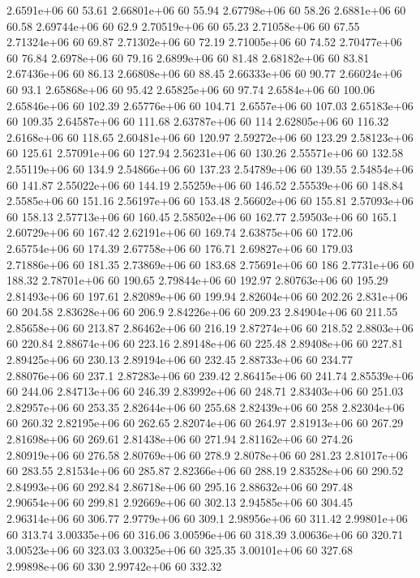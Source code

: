 2.6591e+06 60 53.61
2.66801e+06 60 55.94
2.67798e+06 60 58.26
2.6881e+06 60 60.58
2.69744e+06 60 62.9
2.70519e+06 60 65.23
2.71058e+06 60 67.55
2.71324e+06 60 69.87
2.71302e+06 60 72.19
2.71005e+06 60 74.52
2.70477e+06 60 76.84
2.6978e+06 60 79.16
2.6899e+06 60 81.48
2.68182e+06 60 83.81
2.67436e+06 60 86.13
2.66808e+06 60 88.45
2.66333e+06 60 90.77
2.66024e+06 60 93.1
2.65868e+06 60 95.42
2.65825e+06 60 97.74
2.6584e+06 60 100.06
2.65846e+06 60 102.39
2.65776e+06 60 104.71
2.6557e+06 60 107.03
2.65183e+06 60 109.35
2.64587e+06 60 111.68
2.63787e+06 60 114
2.62805e+06 60 116.32
2.6168e+06 60 118.65
2.60481e+06 60 120.97
2.59272e+06 60 123.29
2.58123e+06 60 125.61
2.57091e+06 60 127.94
2.56231e+06 60 130.26
2.55571e+06 60 132.58
2.55119e+06 60 134.9
2.54866e+06 60 137.23
2.54789e+06 60 139.55
2.54854e+06 60 141.87
2.55022e+06 60 144.19
2.55259e+06 60 146.52
2.55539e+06 60 148.84
2.5585e+06 60 151.16
2.56197e+06 60 153.48
2.56602e+06 60 155.81
2.57093e+06 60 158.13
2.57713e+06 60 160.45
2.58502e+06 60 162.77
2.59503e+06 60 165.1
2.60729e+06 60 167.42
2.62191e+06 60 169.74
2.63875e+06 60 172.06
2.65754e+06 60 174.39
2.67758e+06 60 176.71
2.69827e+06 60 179.03
2.71886e+06 60 181.35
2.73869e+06 60 183.68
2.75691e+06 60 186
2.7731e+06 60 188.32
2.78701e+06 60 190.65
2.79844e+06 60 192.97
2.80763e+06 60 195.29
2.81493e+06 60 197.61
2.82089e+06 60 199.94
2.82604e+06 60 202.26
2.831e+06 60 204.58
2.83628e+06 60 206.9
2.84226e+06 60 209.23
2.84904e+06 60 211.55
2.85658e+06 60 213.87
2.86462e+06 60 216.19
2.87274e+06 60 218.52
2.8803e+06 60 220.84
2.88674e+06 60 223.16
2.89148e+06 60 225.48
2.89408e+06 60 227.81
2.89425e+06 60 230.13
2.89194e+06 60 232.45
2.88733e+06 60 234.77
2.88076e+06 60 237.1
2.87283e+06 60 239.42
2.86415e+06 60 241.74
2.85539e+06 60 244.06
2.84713e+06 60 246.39
2.83992e+06 60 248.71
2.83403e+06 60 251.03
2.82957e+06 60 253.35
2.82644e+06 60 255.68
2.82439e+06 60 258
2.82304e+06 60 260.32
2.82195e+06 60 262.65
2.82074e+06 60 264.97
2.81913e+06 60 267.29
2.81698e+06 60 269.61
2.81438e+06 60 271.94
2.81162e+06 60 274.26
2.80919e+06 60 276.58
2.80769e+06 60 278.9
2.8078e+06 60 281.23
2.81017e+06 60 283.55
2.81534e+06 60 285.87
2.82366e+06 60 288.19
2.83528e+06 60 290.52
2.84993e+06 60 292.84
2.86718e+06 60 295.16
2.88632e+06 60 297.48
2.90654e+06 60 299.81
2.92669e+06 60 302.13
2.94585e+06 60 304.45
2.96314e+06 60 306.77
2.9779e+06 60 309.1
2.98956e+06 60 311.42
2.99801e+06 60 313.74
3.00335e+06 60 316.06
3.00596e+06 60 318.39
3.00636e+06 60 320.71
3.00523e+06 60 323.03
3.00325e+06 60 325.35
3.00101e+06 60 327.68
2.99898e+06 60 330
2.99742e+06 60 332.32
